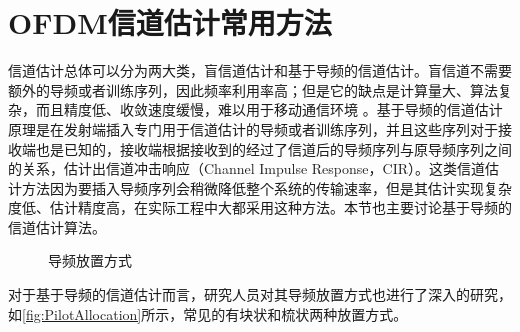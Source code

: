 \section{OFDM信道估计常用方法}
信道估计总体可以分为两大类，盲信道估计和基于导频的信道估计。盲信道不需要额外的导频或者训练序列，因此频率利用率高；但是它的缺点是计算量大、算法复杂，而且精度低、收敛速度缓慢，难以用于移动通信环境
\cite{石钧2012ofdm}。基于导频的信道估计原理是在发射端插入专门用于信道估计的导频或者训练序列，并且这些序列对于接收端也是已知的，接收端根据接收到的经过了信道后的导频序列与原导频序列之间的关系，估计出信道冲击响应（Channel Impulse Response，CIR）。这类信道估计方法因为要插入导频序列会稍微降低整个系统的传输速率，但是其估计实现复杂度低、估计精度高，在实际工程中大都采用这种方法。本节也主要讨论基于导频的信道估计算法。
\begin{figure}[htbp]
    \centering
    \caption{导频放置方式}
    \label{fig:PilotAllocation}
\end{figure}
对于基于导频的信道估计而言，研究人员对其导频放置方式也进行了深入的研究，如\autoref{fig:PilotAllocation}所示，常见的有块状和梳状两种放置方式。

